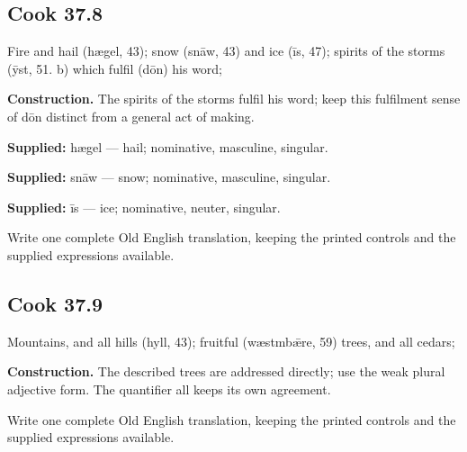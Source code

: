 \par\begin{minipage}{\linewidth}\raggedright
\subsection*{Cook 37.8}

Fire and hail (hægel, 43); snow (snāw, 43) and ice (īs, 47); spirits of the storms (ȳst, 51. b) which fulfil (dōn) his word;

\textbf{Construction.} The spirits of the storms fulfil his word; keep this fulfilment sense of dōn distinct from a general act of making.

\end{minipage}\par\addvspace{4pt}

\textbf{Supplied:} hægel — hail; nominative, masculine, singular.

\textbf{Supplied:} snāw — snow; nominative, masculine, singular.

\textbf{Supplied:} īs — ice; nominative, neuter, singular.

Write one complete Old English translation, keeping the printed controls and the supplied expressions available.

\par\begin{minipage}{\linewidth}\raggedright
\subsection*{Cook 37.9}

Mountains, and all hills (hyll, 43); fruitful (wæstmbǣre, 59) trees, and all cedars;

\textbf{Construction.} The described trees are addressed directly; use the weak plural adjective form. The quantifier all keeps its own agreement.

Write one complete Old English translation, keeping the printed controls and the supplied expressions available.

\end{minipage}\par\addvspace{4pt}

